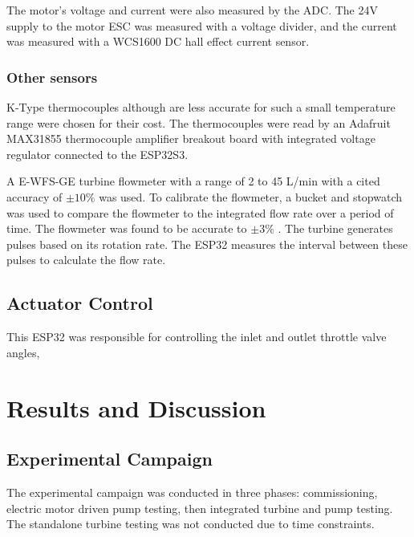 The motor's voltage and current were also measured by the ADC. The 24V supply to the motor ESC was measured with a voltage divider, and the current was measured with a WCS1600 DC hall effect current sensor.

\subsubsection{Other sensors}

K-Type thermocouples although are less accurate for such a small temperature range were chosen for their cost. The thermocouples were read by an Adafruit MAX31855 thermocouple amplifier breakout board with integrated voltage regulator connected to the ESP32S3. 

A E-WFS-GE turbine flowmeter with a range of 2 to 45 L/min with a cited accuracy of $\pm10\%$ was used. To calibrate the flowmeter, a bucket and stopwatch was used to compare the flowmeter to the integrated flow rate over a period of time. The flowmeter was found to be accurate to $\pm3\%$ \cite{flowmtr}. The turbine generates pulses based on its rotation rate. The ESP32 measures the interval between these pulses to calculate the flow rate. %

\subsection{Actuator Control}

This ESP32 was responsible for controlling the inlet and outlet throttle valve angles, 

\section{Results and Discussion}



\subsection{Experimental Campaign}

The experimental campaign was conducted in three phases: commissioning, electric motor driven pump testing, then integrated turbine and pump testing. The standalone turbine testing was not conducted due to time constraints.

